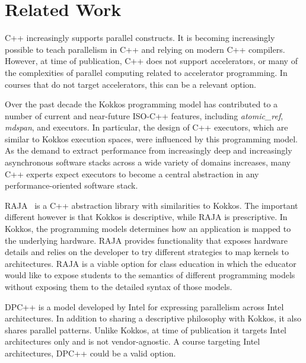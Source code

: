 \section{Related Work}\label{chap:related}


C++ increasingly supports parallel constructs. It is becoming increasingly possible to teach parallelism in C++ and relying on modern C++ compilers. However, at time of publication, C++ does not support accelerators, or many of the complexities of parallel computing related to accelerator programming. In courses that do not target accelerators, this can be a relevant option.

Over the past decade the Kokkos programming model has contributed to a number of current and near-future ISO-C++ features, including \emph{atomic\_ref}\cite{wg21_p0019}, \emph{mdspan}\cite{MDSPAN}, and executors.  In particular, the design of C++ executors, which are similar to Kokkos execution spaces, were influenced by this programming model. As the demand to extract performance from increasingly deep and increasingly asynchronous software stacks across a wide variety of domains increases, many C++ experts expect executors to become a central abstraction in any performance-oriented software stack. 

RAJA~\cite{RAJA} is a C++ abstraction library with similarities to Kokkos. The important different however is that Kokkos is descriptive, while RAJA is prescriptive. In Kokkos, the programming models determines how an application is mapped to the underlying hardware. RAJA provides functionality that exposes hardware details and relies on the developer to try different strategies to map kernels to architectures. RAJA is a viable option for class education in which the educator would like to expose students to the semantics of different programming models without exposing them to the detailed syntax of those models.

DPC++\cite{DPCPP} is a model developed by Intel\textsuperscript{\textregistered} for expressing parallelism across Intel architectures. In addition to sharing a descriptive philosophy with Kokkos, it also shares parallel patterns. Unlike Kokkos, at time of publication it targets Intel architectures only and is not vendor-agnostic. A course targeting Intel architectures, DPC++ could be a valid option.
 
